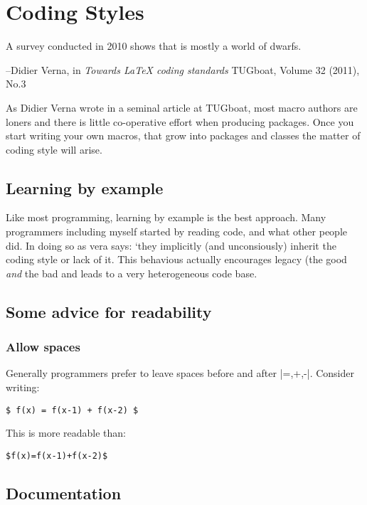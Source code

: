 \chapter{Coding Styles}

\epigraph{A survey conducted in 2010 shows that \latex is mostly a world of dwarfs.}{--Didier Verna, in \textit{Towards LaTeX coding standards} TUGboat, Volume 32 (2011), No.3}

As Didier Verna \citep{verna} wrote in a seminal article at TUGboat, most \latex macro authors are loners and there is little co-operative effort when producing packages. Once you start writing your own macros, that grow into packages and classes the matter of coding style will arise.

\section{Learning by example}

Like most programming, learning by example is the best approach. Many \latex programmers including myself started by reading code, and what other people did. In doing so as vera says: `they implicitly (and unconsiously) inherit the coding style or lack of it. This behavious actually encourages legacy (the good \textit{and} the bad and leads to a very heterogeneous code base.

\section{Some advice for readability}

\subsection{Allow spaces}

Generally programmers prefer to leave spaces before and after |=,+,-|. Consider writing:

\begin{verbatim}
$ f(x) = f(x-1) + f(x-2) $
\end{verbatim}

This is more readable than:

\begin{verbatim}
$f(x)=f(x-1)+f(x-2)$
\end{verbatim}

\section{Documentation}














